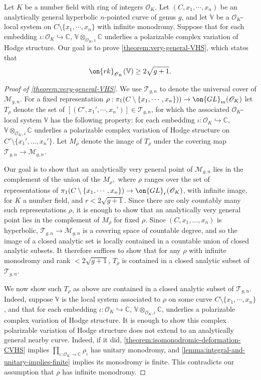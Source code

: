 \documentclass[12 pt]{amsart}
\theoremstyle{plain}
\theoremstyle{definition}
\theoremstyle{remark}
\numberwithin{equation}{section}
\begin{document}
Let $K$ be a number field with ring of integers
$\mathscr{O}_K$. Let $(C, x_1, \cdots, x_n)$ be an analytically general
hyperbolic $n$-pointed curve of genus $g$, and let $\mathbb{V}$ be a $\mathscr{O}_K$-local system on $C\setminus\{x_1, \cdots, x_n\}$ with infinite monodromy.
 Suppose that for each embedding $\iota: \mathscr{O}_K\hookrightarrow
 \mathbb{C}$, $\mathbb{V}\otimes_{\mathscr{O}_K, \iota}\mathbb{C}$ underlies a
 polarizable complex variation of Hodge structure. Our goal is to prove
 \autoref{theorem:very-general-VHS}, which states that $$\on{rk}_{\mathscr{O}_K}(\mathbb{V})\geq 2\sqrt{g+1}.$$

\begin{proof}[Proof of \autoref{theorem:very-general-VHS}]
	We use 
	$\mathscr{T}_{g,n}$ to denote the universal cover of $\mathscr{M}_{g,n}$.
For a fixed representation
$\rho: \pi_1(C\setminus\{x_1, \cdots, x_n\}))\to \on{GL}_m(\mathscr{O}_K)$
let $T_\rho$ denote the set of $[(C', x_1', \cdots, x_n')]\in
\mathscr{T}_{g,n}$,
for which the associated $\mathscr O_K$-local system $\mathbb V$ has the
following property:
for each embedding $\iota: \mathscr{O}_K\hookrightarrow \mathbb{C}$,
$\mathbb{V}\otimes_{\mathscr{O}_K, \iota}\mathbb{C}$ underlies a polarizable
complex variation of Hodge structure on $C' \setminus \{x_1', \ldots, x_n'\}$.
Let $M_\rho$ denote the image of $T_\rho$ under the covering map
$\mathscr{T}_{g,n} \to \mathscr M_{g,n}$.

Our goal is to show that an analytically very general point of $\mathscr M_{g,n}$ lies in the complement of
the union of the $M_\rho,$ where $\rho$ ranges over the set of representations
of $\pi_1(C\setminus\{x_1, \cdots, x_n\})\to \on{GL}_r(\mathscr{O}_K)$, with
infinite image, for $K$ a number field, and $r<2\sqrt{g+1}$.
Since there are only countably many such representations $\rho$,
it is enough to show that an analytically very general point lies in the complement
of $M_\rho$ for fixed $\rho$.
Since $(C, x_1, \ldots, x_n)$ is hyperbolic, 
$\mathscr{T}_{g,n} \to \mathscr M_{g,n}$
is a covering space of countable degree, and so the image of a closed analytic
set is locally contained in a countable union of closed analytic subsets.
It therefore suffices to show that for any $\rho$ with infinite monodromy and
rank $< 2 \sqrt{g+1}$, $T_\rho$ is contained in a closed analytic subset
of $\mathscr T_{g,n}$.

We now show such $T_\rho$ as above are contained in a closed analytic subset of
$\mathscr{T}_{g,n}$.
Indeed, suppose $\mathbb V$ is the local system associated to $\rho$ on some curve $C\setminus\{x_1, \cdots, x_n\}$, and that for each embedding $\iota: \mathscr{O}_K\hookrightarrow \mathbb{C}$, $\mathbb{V}\otimes_{\mathscr{O}_K, \iota} \mathbb{C}$, underlies a polarizable complex variation of Hodge structure. 
It is enough to show this complex polarizable variation of Hodge structure does
not extend to an analytically general nearby curve.
Indeed, if it did,
\autoref{theorem:isomonodromic-deformation-CVHS} implies
$\prod_{\iota: \mathscr O_K \to \mathbb C} \rho_\iota$
has unitary monodromy,
and
\autoref{lemma:integral-and-unitary-implies-finite} implies its monodromy is
finite.
This contradicts our assumption that $\rho$ has infinite monodromy. \end{proof}
\end{document}
